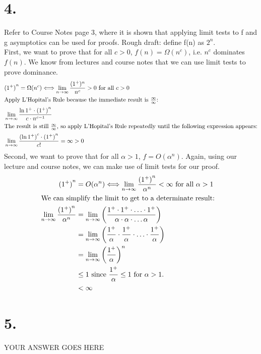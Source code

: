 \documentclass[11pt]{article}
\begin{document}
\section*{4.}
Refer to Course Notes page 3, where it is shown that applying limit tests to f and g asymptotics can be used for proofs. Rough draft: define f(n) as $2^n$.\\
First, we want to prove that for all $c>0$, $f(n)=\Omega(n^c)$, i.e. $n^c$ dominates $f(n)$. We know from lectures and course notes that we can use limit tests to prove dominance.
\begin{align*}
    &{(1^+)}^n = \Omega(n^c) \Longleftrightarrow 
    \lim_{n \to \infty} \frac{(1^+)^n}{n^c} > 0 \text{ for all } c > 0& \\
    \intertext{Apply L'Hopital's Rule because the immediate result is $\frac{\infty}{\infty}$:}
    &\lim_{n \to \infty} \frac{\ln 1^+ \cdot {(1^+)}^n}{c \cdot n^{c-1}}&\\
    \intertext{The result is still $\frac{\infty}{\infty}$, so apply L'Hopital's Rule repeatedly until the following expression appears:}
    &\lim_{n \to \infty} \frac{{(\ln 1^+)}^{c} \cdot {(1^+)}^n}{c!} = \infty > 0&
\end{align*}
Second, we want to prove that for all $\alpha > 1$, $f = O(\alpha ^n)$. Again, using our lecture and course notes, we can make use of limit tests for our proof.
\begin{align*}
    {(1^+)}^n &= O(\alpha^n) \Longleftrightarrow \lim_{n \to \infty} \frac{{(1^+)}^n}{\alpha^n} < \infty \text{ for all } \alpha > 1&\\
    \intertext{We can simplify the limit to get to a determinate result:}
    \lim_{n \to \infty} \frac{{(1^+)}^n}{\alpha^n} &= \lim_{n \to \infty} \left(\frac{{1^+ \cdot 1^+ \cdot \ldots \cdot 1^+}}{\alpha \cdot \alpha \cdot \ldots \alpha}\right)&\\
    &= \lim_{n \to \infty} \left(\frac{1^+}{\alpha} \cdot \frac{1^+}{\alpha} \cdot \ldots \cdot \frac{1^+}{\alpha}\right)&\\
    &= \lim_{n \to \infty} {\left(\frac{1^+}{\alpha}\right)}^n&\\
    &\leq 1 \text{ since $\frac{1^+}{\alpha} \leq 1$ for $\alpha > 1$.}&\\
    &<\infty
\end{align*}

\newpage
\section*{5.}
YOUR ANSWER GOES HERE
\end{document}
